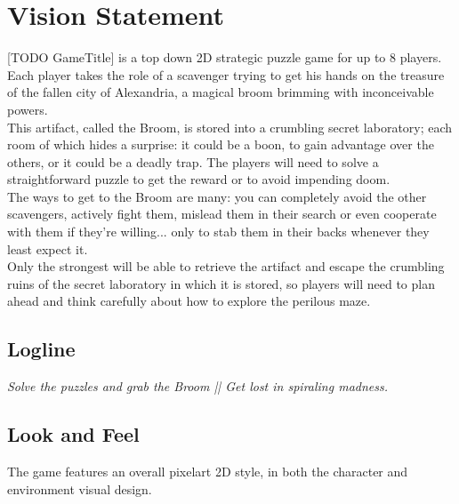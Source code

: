 \section{Vision Statement}

[TODO GameTitle] is a top down 2D strategic puzzle game for up to 8 players. \\

Each player takes the role of a scavenger trying to get his hands on the treasure of the fallen city of Alexandria, a magical broom brimming with inconceivable powers. \\

This artifact, called the Broom, is stored into a crumbling secret laboratory; each room of which hides a surprise: it could be a boon, to gain advantage over the others, or it could be a deadly trap. The players will need to solve a straightforward puzzle to get the reward or to avoid impending doom. \\

The ways to get to the Broom are many: you can completely avoid the other scavengers, actively fight them, mislead them in their search or even cooperate with them if they're willing... only to stab them in their backs whenever they least expect it. \\

Only the strongest will be able to retrieve the artifact and escape the crumbling ruins of the secret laboratory in which it is stored, so players will need to plan ahead and think carefully about how to explore the perilous maze. \\

\subsection{Logline}

\textit{Solve the puzzles and grab the Broom || Get lost in spiraling madness.}

\pagebreak 

\subsection{Look and Feel}

The game features an overall pixelart 2D style, in both the character and environment visual design. 




